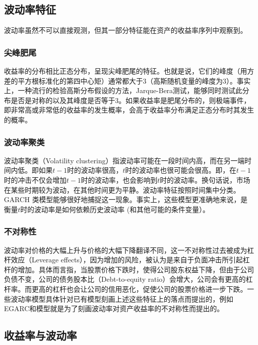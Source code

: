 \documentclass[11pt]{article}
\begin{document}
\subsection{波动率特征}

波动率虽然不可以直接观测，但其一部分特征能在资产的收益率序列中观察到。

\subsubsection{尖峰肥尾}

收益率的分布相比正态分布，呈现尖峰肥尾的特征。也就是说，它们的峰度（用方差的平方根标准化的第四中心矩）通常都大于3（高斯随机变量的峰度为3）。事实上，一种流行的检验高斯分布假设的方法，Jarque-Bera测试，能够同时测试此分布是否是对称的以及其峰度是否等于3。如果收益率是肥尾分布的，则极端事件，即非常高或非常低的收益率的发生概率，会高于收益率分布满足正态分布时其发生的概率。

\subsubsection{波动率聚类}

波动率聚类（Volatility clustering）指波动率可能在一段时间内高，而在另一端时间内低。即如果$t−1$时的波动率很高，$t$时的波动率也很可能会很高。即，在$t−1$时的冲击不仅会增加$t−1$时的波动率，也会影响到$t$时的波动率。换句话说，市场在某些时期较为波动，在其他时间更为平静。波动率特征按照时间集中分类。GARCH 类模型能够很好地捕捉这一现象。事实上，这些模型更准确地来说，是衡量$t$时的波动率是如何依赖历史波动率 (和其他可能的条件变量）。

\subsubsection{不对称性}

波动率对价格的大幅上升与价格的大幅下降翻译不同，这一不对称性过去被成为杠杆效应（Leverage effects），因为增加的风险，被认为是来自于负面冲击所引起杠杆的增加。具体而言指，当股票价格下跌时，使得公司股东权益下降，但由于公司负债不变，公司的债务股本比（Debt-to-equity ratio）会增大，公司会有更高的杠杆率。而更高的杠杆也会让公司的信用恶化，促使公司的股票价格进一步下跌。一些波动率模型具体针对已有模型刻画上述这些特征上的落点而提出的，例如EGARC和模型就是为了刻画波动率对资产收益率的不对称性而提出的。

\subsection{收益率与波动率}
\end{document}

